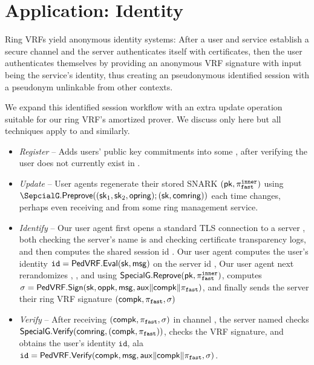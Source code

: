 \section{Application: Identity}
\label{sec:app_identity}

Ring VRFs yield anonymous identity systems:
After a user and service establish a secure channel and
the server authenticates itself with certificates, then
the user authenticates themselves by providing an anonymous
VRF signature with input \msg being the service's identity,
thus creating an pseudonymous identified session with
a pseudonym unlinkable from other contexts.

We expand this identified session workflow with an extra
update operation suitable for our ring VRF's amortized prover.
We discuss only \pifast here but all techniques apply to \pisk and \pipk similarly. 

\begin{itemize}
\item {\em Register} --
 Adds users' public key commitments into some \ring,
 after verifying the user does not currently exist in \ring.
\item {\em Update} --
 User agents regenerate their stored SNARK $(\mathsf{pk},\pi_{\mathtt{fast}}^{\mathtt{inner}})$ using
 $\SepcialG.\Preprove( (\sk_1,\sk_2,\openring); (\sk,\comring) )$
 each time \ring changes, perhaps even receiving \comring and \openring
 from some ring management service.
\item {\em Identify} --
 Our user agent first opens a standard TLS connection to a server \msg,
 both checking the server's name is \msg and checking certificate
 transparency logs, and then computes the shared session id \aux.
 Our user agent computes the user's identity
  $\mathtt{id} = {\mathsf{PedVRF}}.{\mathsf{Eval}}(\mathsf{sk},\mathsf{msg})$ on the server id \msg,
 Our user agent next rerandomizes \pifast, \compk, and \openpk using
 ${\mathsf{SpecialG}}.{\mathsf{Reprove}}( \mathsf{pk}, \pi_{\mathtt{fast}}^{\mathtt{inner}} )$, computes
  $\sigma = {\mathsf{PedVRF}}.{\mathsf{Sign}}(\mathsf{sk},\mathsf{oppk},\mathsf{msg},\mathsf{aux} \| \mathsf{compk} \| \pi_{\mathtt{fast}})$,
 and finally sends the server their ring VRF signature $(\mathsf{compk},\pi_{\mathtt{fast}},\sigma)$
\item {\em Verify} -- 
 After receiving $(\mathsf{compk},\pi_{\mathtt{fast}},\sigma)$ in channel \aux,
 the server named \msg checks ${\mathsf{SpecialG}}.{\mathsf{Verify}}( \mathsf{comring}, (\mathsf{compk},\pi_{\mathtt{fast}}) )$,
 checks the VRF signature, and obtains the user's identity $\mathtt{id}$, ala \\
 $\mathtt{id} = {\mathsf{PedVRF}}.{\mathsf{Verify}}(\mathsf{compk},\mathsf{msg},\mathsf{aux} \| \mathsf{compk} \| \pi_{\mathtt{fast}},\sigma)$.
\end{itemize}


